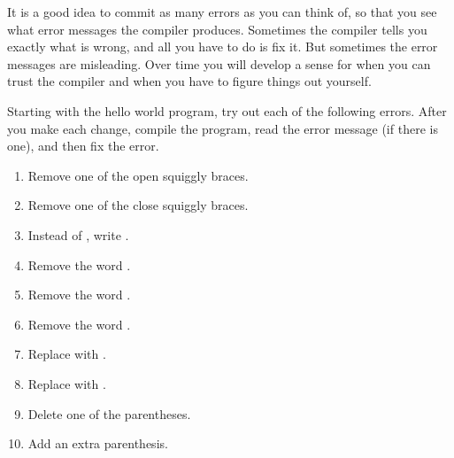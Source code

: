 \begin{exercise}  %

It is a good idea to commit as many errors as you can think of, so that you see what error messages the compiler produces.
Sometimes the compiler tells you exactly what is wrong, and all you have to do is fix it.
But sometimes the error messages are misleading.
Over time you will develop a sense for when you can trust the compiler and when you have to figure things out yourself.

Starting with the hello world program, try out each of the following errors.
After you make each change, compile the program, read the error message (if there is one), and then fix the error.

\begin{enumerate}
\item Remove one of the open squiggly braces.
\item Remove one of the close squiggly braces.
\item Instead of , write .
\item Remove the word .
\item Remove the word .
\item Remove the word .
\item Replace  with .
\item Replace  with .
\item Delete one of the parentheses.
\item Add an extra parenthesis.
\end{enumerate}

\end{exercise}

